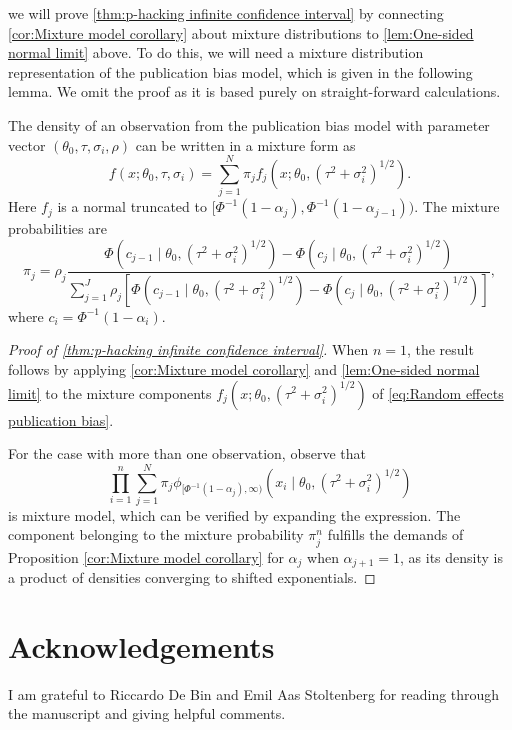 \documentclass[twoside]{article}
\begin{document}
we will prove \cref{thm:p-hacking infinite confidence interval} by connecting \cref{cor:Mixture model corollary} about mixture distributions to \cref{lem:One-sided normal limit} above. To do this, we will need a mixture distribution representation of the publication bias model, which is given in the following lemma. We omit the proof as it is based purely on straight-forward calculations. 
\begin{lem}
\label{lem:Mixture representation} The density of an observation
from the publication bias model with parameter vector $(\theta_{0},\tau,\sigma_{i},\rho)$ can be written in a mixture form as
\begin{equation}
f(x;\theta_{0},\tau,\sigma_{i})=\sum_{j=1}^{N}\pi_{j}f_j(x;\theta_{0},(\tau^{2}+\sigma_{i}^{2})^{1/2}).\label{eq:Random effects publication bias}
\end{equation}
Here $f_j$ is a normal truncated to ${[\Phi^{-1}(1-\alpha_{j}),\Phi^{-1}(1-\alpha_{j-1}))}$. The mixture probabilities are
\[
\pi_{j}=\rho_{j}\frac{\Phi(c_{j-1}\mid\theta_{0},(\tau^{2}+\sigma_{i}^{2})^{1/2})-\Phi(c_{j}\mid\theta_{0},(\tau^{2}+\sigma_{i}^{2})^{1/2})}{\sum_{j=1}^{J}\rho_{j}[\Phi(c_{j-1}\mid\theta_{0},(\tau^{2}+\sigma_{i}^{2})^{1/2})-\Phi(c_{j}\mid\theta_{0},(\tau^{2}+\sigma_{i}^{2})^{1/2})]},
\]
where $c_i = \Phi^{-1}(1-\alpha_{i})$.
\end{lem}

\begin{proof}[Proof of \cref{thm:p-hacking infinite confidence interval}]
When $n=1$, the result follows by applying \cref{cor:Mixture model corollary} and \cref{lem:One-sided normal limit} to the mixture components $f_j(x;\theta_{0},(\tau^{2}+\sigma_{i}^{2})^{1/2})$ of \cref{eq:Random effects publication bias}.

For the case with more than one observation, observe that 
\[
\prod_{i=1}^{n}\sum_{j=1}^{N}\pi_{j}\phi_{[\Phi^{-1}(1-\alpha_{j}),\infty)}(x_{i}\mid\theta_{0},(\tau^{2}+\sigma_{i}^{2})^{1/2})
\]
is mixture model, which can be verified by expanding the expression. The component belonging to the mixture probability $\pi_{j}^{n}$ fulfills the demands of Proposition \ref{cor:Mixture model corollary} for $\alpha_{j}$ when $\alpha_{j+1}=1$, as its density is a product of densities converging to shifted exponentials.
\end{proof}


\section*{Acknowledgements}
I am grateful to Riccardo De Bin and Emil Aas Stoltenberg for reading through the manuscript and giving helpful comments.



\end{document}
